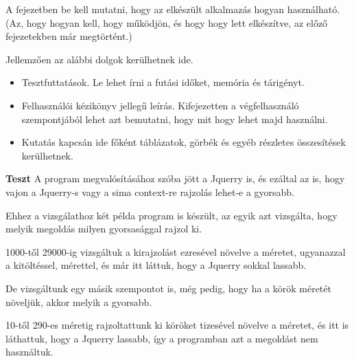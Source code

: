 
A fejezetben be kell mutatni, hogy az elkészült alkalmazás hogyan használható.
(Az, hogy hogyan kell, hogy működjön, és hogy hogy lett elkészítve, az előző fejezetekben már megtörtént.)

Jellemzően az alábbi dolgok kerülhetnek ide.
\begin{itemize}
\item Tesztfuttatások. Le lehet írni a futási időket, memória és tárigényt.
\item Felhasználói kézikönyv jellegű leírás. Kifejezetten a végfelhasználó szempontjából lehet azt bemutatni, hogy mit hogy lehet majd használni.
\item Kutatás kapcsán ide főként táblázatok, görbék és egyéb részletes összesítések kerülhetnek.

\end{itemize}

\textbf{Teszt}
A program megvalósításához szóba jött a Jquerry is, és ezáltal az is, hogy vajon a Jquerry-s vagy a sima context-re rajzolás lehet-e a gyorsabb.

Ehhez a vizsgálathoz két példa program is készült, az egyik azt vizsgálta, hogy melyik megoldás milyen gyorsasággal rajzol ki. 

1000-től 29000-ig vizsgáltuk a kirajzolást ezresével növelve a méretet, ugyanazzal a kitöltéssel, mérettel, és már itt láttuk, hogy a Jquerry sokkal lassabb. 

De vizsgáltunk egy másik szempontot is, még pedig, hogy ha a körök méretét növeljük, akkor melyik a gyorsabb. 

10-től 290-es méretig rajzoltattunk ki köröket tizesével növelve a méretet, és itt is láthattuk, hogy a Jquerry lassabb, így a programban azt a megoldást nem használtuk. 

